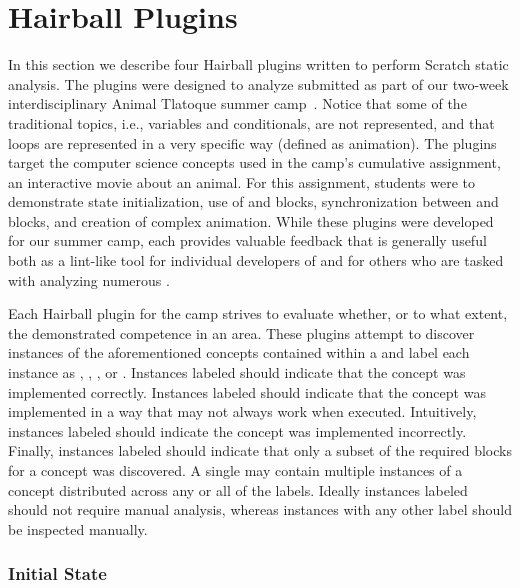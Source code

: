 \section{Hairball Plugins} 
In this section we describe four Hairball plugins written to perform Scratch
static analysis.  The plugins were designed to analyze  submitted
as part of our two-week interdisciplinary Animal Tlatoque summer
camp~\cite{Franklin:2013:SBO}.  Notice that some of the traditional topics,
i.e., variables and conditionals, are not represented, and that loops are
represented in a very specific way (defined as animation). The plugins target
the computer science concepts used in the camp's cumulative assignment, an
interactive movie about an animal. For this assignment, students were to
demonstrate state initialization, use of \broadcast{} and \receive{} blocks,
synchronization between \say{} and \playsound{} blocks, and creation of complex
animation. While these plugins were developed for our summer camp, each
provides valuable feedback that is generally useful both as a lint-like tool
for individual developers of  and for others who are tasked with
analyzing numerous .

Each Hairball plugin for the camp strives to evaluate whether, or to what
extent, the \sprogram{} demonstrated competence in an area. These plugins
attempt to discover instances of the aforementioned concepts contained within a
\sprogram{} and label each instance as \correct{}, \semincor{}, \incor{}, or
\incom{}. Instances labeled \correct{} should indicate that the concept was
implemented correctly. Instances labeled \semincor{} should indicate that the
concept was implemented in a way that may not always work when
executed. Intuitively, instances labeled \incor{} should indicate the concept
was implemented incorrectly. Finally, instances labeled \incom{} should
indicate that only a subset of the required blocks for a concept was
discovered. A single \sprogram{} may contain multiple instances of a concept
distributed across any or all of the labels. Ideally instances labeled
\correct{} should not require manual analysis, whereas instances with any other
label should be inspected manually.


\subsubsection{Initial State}

